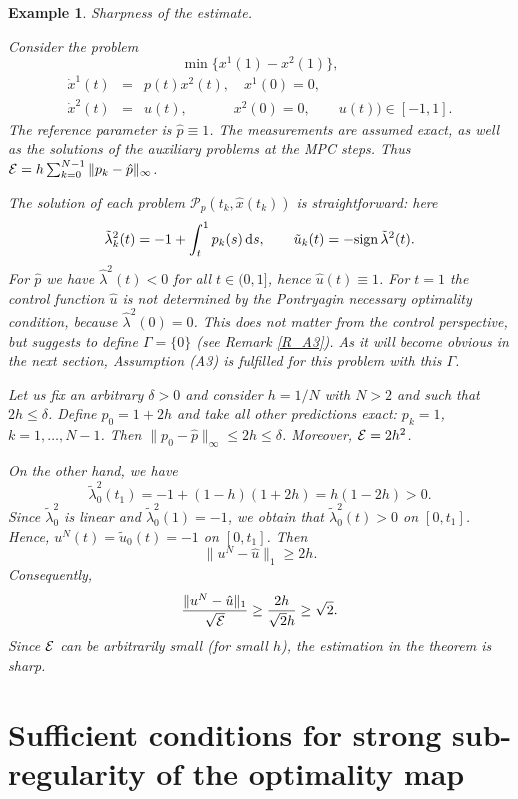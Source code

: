 \documentclass[11pt]{article}
\newtheorem{example}[theo]{Example}
\newcommand{\bd}{\begin{displaymath}}
\newcommand{\ed}{\end{displaymath}}
\newcommand{\bda}{\begin{eqnarray*}}
\newcommand{\eda}{\end{eqnarray*}}
\newcommand{\E}{{\cal E}}
\newcommand{\dd}{\mbox{\rm\,d}}
\newcommand{\p}{{\mathcal P}}
\begin{document}
\begin{example} \label{Example} Sharpness of the estimate. {\em
Consider the problem 
\bd
        \min \{ x^1(1) - x^2(1) \},
\ed
\bda 
             \dot x^1(t) &=& p(t) x^2(t), \quad x^1(0) = 0, \\
             \dot x^2(t)& =& u(t), \qquad\quad\; x^2(0) = 0, \qquad u(t)) \in [-1,1].
\eda
The reference parameter is $\hat p \equiv 1$. The measurements are assumed exact, as well as the solutions of the 
auxiliary problems at the MPC steps. Thus $\E = h \sum_{k=0}^{N-1} \| p_k - \hat p \|_\infty$.

The solution of each problem $\p_p(t_k, \hat x(t_k))$ is straightforward: here 
\bd
         \tilde \lambda_k^2( t ) = -1 + \int_t^1 p_k(s) \dd s, \qquad \tilde u_k ( t) = - {\rm sign }\, \tilde\lambda^2(t).
\ed
For $\hat p$ we have $\hat \lambda^2( t ) < 0$  for all $t \in (0,1]$, hence $\hat u(t) \equiv 1$. 
For $t = 1$ the control function $\hat u$ is not determined
by the Pontryagin necessary optimality condition, because $\hat \lambda^2( 0) = 0$. 
This does not matter from the control perspective, but suggests to define $\Gamma = \{ 0 \}$  (see Remark \ref{R_A3}).
As it will become obvious in the next section, Assumption (A3) is fulfilled for this problem with this $\Gamma$.

Let us fix an arbitrary $\delta > 0$ and consider $h= 1/N$ with $N > 2$ and such that $2h \leq \delta$.
Define $p_0 = 1+ 2h$ and take all other predictions exact: $p_k = 1$, $k = 1, \ldots, N-1$.
Then $\|p_0 - \hat p\|_\infty \leq 2h \leq\delta$. Moreover,  $\E = 2h^2$.

On the other hand, we have
\bd
           \tilde \lambda^2_0(t_{1}) = -1 + (1-h)  (1+2h) = h(1-2h) > 0.
\ed
Since $\tilde \lambda^2_0$ is linear and $\tilde \lambda^2_0(1) = -1$, 
we obtain that $\tilde \lambda^2_0(t) > 0$ on $[0,t_1]$.
Hence, $u^N(t) = \tilde u_0(t) = -1$ on $[0,t_1]$.  Then 
\bd
           \|u^N - \hat u \|_1 \geq 2h.
\ed
Consequently,
\bd
          \frac{ \|u^N - \hat u \|_1}{\sqrt{\E}} \geq \frac{2h}{\sqrt{2}h} \geq \sqrt{2}.
\ed
Since $\E$ can be arbitrarily small (for small $h$), the estimation in the theorem is sharp. 
}\end{example}

\section{Sufficient conditions for strong sub-regularity of the optimality map} \label{S_conditions}
\end{document}
